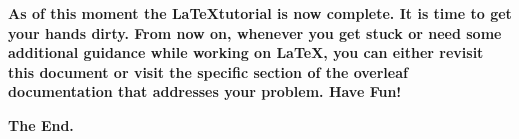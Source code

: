 \documentclass[12pt, letterpaper, twoside]{article}
\begin{document}

\textbf{As of this moment the \LaTeX tutorial is now complete. It is time to get your hands dirty. From now on, whenever you get stuck or need some additional guidance while working on \LaTeX, you can either revisit this document or visit the specific section of the overleaf documentation that addresses your problem. Have Fun!}

\textbf{The End.}
\end{document}
